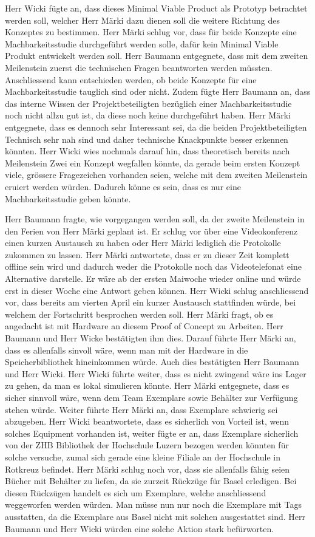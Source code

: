 \documentclass[parskip=full, a4paper]{scrreprt}
\begin{document}
Herr Wicki fügte an, dass dieses Minimal Viable Product als Prototyp betrachtet werden soll, welcher Herr Märki dazu dienen soll die weitere Richtung des Konzeptes zu bestimmen.
Herr Märki schlug vor, dass für beide Konzepte eine Machbarkeitsstudie durchgeführt werden solle, dafür kein Minimal Viable Produkt entwickelt werden soll. Herr Baumann entgegnete, dass mit dem zweiten Meilenstein zuerst die technischen Fragen beantworten werden müssten. Anschliessend kann entschieden werden, ob beide Konzepte für eine Machbarkeitsstudie tauglich sind oder nicht. Zudem fügte Herr Baumann an, dass das interne Wissen der Projektbeteiligten bezüglich einer Machbarkeitsstudie noch nicht allzu gut ist, da diese noch keine durchgeführt haben. 
Herr Märki entgegnete, dass es dennoch sehr Interessant sei, da die beiden Projektbeteiligten Technisch sehr nah sind und daher technische Knackpunkte besser erkennen könnten.
Herr Wicki wies nochmals darauf hin, dass theoretisch bereits nach Meilenstein Zwei ein Konzept wegfallen könnte, da gerade beim ersten Konzept viele, grössere Fragezeichen vorhanden seien, welche mit dem zweiten Meilenstein eruiert werden würden. Dadurch könne es sein, dass es nur eine Machbarkeitsstudie geben könnte.

Herr Baumann fragte, wie vorgegangen werden soll, da der zweite Meilenstein in den Ferien von Herr Märki geplant ist. Er schlug vor über eine Videokonferenz einen kurzen Austausch zu haben oder Herr Märki lediglich die Protokolle zukommen zu lassen.
Herr Märki antwortete, dass er zu dieser Zeit komplett offline sein wird und dadurch weder die Protokolle noch das Videotelefonat eine Alternative darstelle. Er wäre ab der ersten Maiwoche wieder online und würde erst in dieser Woche eine Antwort geben können.
Herr Wicki schlug anschliessend vor, dass bereits am vierten April ein kurzer Austausch stattfinden würde, bei welchem der Fortschritt besprochen werden soll. 
Herr Märki fragt, ob es angedacht ist mit Hardware an diesem Proof of Concept zu Arbeiten. Herr Baumann und Herr Wicke bestätigten ihm dies. Darauf führte Herr Märki an, dass es allenfalls sinvoll wäre, wenn man mit der Hardware in die Speicherbibliothek hineinkommen würde. Auch dies bestätigten Herr Baumann und Herr Wicki. Herr Wicki führte weiter, dass es nicht zwingend wäre ins Lager zu gehen, da man es lokal simulieren könnte. 
Herr Märki entgegnete, dass es sicher sinnvoll wäre, wenn dem Team Exemplare sowie Behälter zur Verfügung stehen würde. Weiter führte Herr Märki an, dass Exemplare schwierig sei abzugeben. Herr Wicki beantwortete, dass es sicherlich von Vorteil ist, wenn solches Equipment vorhanden ist, weiter fügte er an, dass Exemplare sicherlich von der ZHB Bibliothek der Hochschule Luzern bezogen werden könnten für solche versuche, zumal sich gerade eine kleine Filiale an der Hochschule in Rotkreuz befindet.
Herr Märki schlug noch vor, dass sie allenfalls fähig seien Bücher mit Behälter zu liefen, da sie zurzeit Rückzüge für Basel erledigen. Bei diesen Rückzügen handelt es sich um Exemplare, welche anschliessend weggeworfen werden würden. Man müsse nun nur noch die Exemplare mit Tags ausstatten, da die Exemplare aus Basel nicht mit solchen ausgestattet sind.
Herr Baumann und Herr Wicki würden eine solche Aktion stark befürworten.
\end{document}
